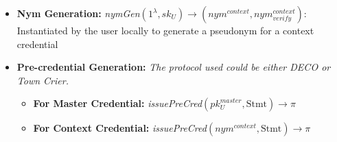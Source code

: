 \begin{itemize}
\item \textbf{Nym Generation:} \textit{nymGen$(1^\lambda, sk_U) \rightarrow (nym^{context}, nym^{context}_{verify})$}: Instantiated by the user locally to generate a pseudonym for a context credential
\end{itemize}


\begin{itemize}
\item \textbf{Pre-credential Generation:} \textit{The protocol used could be either DECO or Town Crier.}
    \begin{itemize}
    \item \textbf{For Master Credential:} \textit{issuePreCred$(pk_U^{master}, \text{Stmt}) \rightarrow \pi$}
    \item \textbf{For Context Credential:} \textit{issuePreCred$(nym^{context}, \text{Stmt}) \rightarrow \pi$}
    \end{itemize}
\end{itemize}

